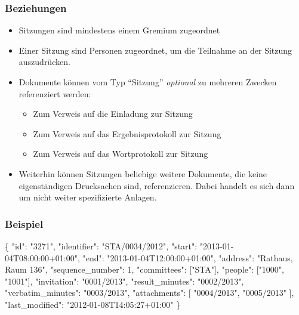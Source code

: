 \documentclass[,a4paper]{article}
\newenvironment{Shaded}{}{}
\newcommand{\DataTypeTok}[1]{\textcolor[rgb]{0.56,0.13,0.00}{{#1}}}
\newcommand{\DecValTok}[1]{\textcolor[rgb]{0.25,0.63,0.44}{{#1}}}
\newcommand{\StringTok}[1]{\textcolor[rgb]{0.25,0.44,0.63}{{#1}}}
\newcommand{\NormalTok}[1]{{#1}}
\begin{document}
\subsubsection{Beziehungen}

\begin{itemize}
\item
  Sitzungen sind mindestens einem Gremium zugeordnet
\item
  Einer Sitzung sind Personen zugeordnet, um die Teilnahme an der
  Sitzung auszudrücken.
\item
  Dokumente können vom Typ ``Sitzung'' \emph{optional} zu mehreren
  Zwecken referenziert werden:

  \begin{itemize}
  \item
    Zum Verweis auf die Einladung zur Sitzung
  \item
    Zum Verweis auf das Ergebnisprotokoll zur Sitzung
  \item
    Zum Verweis auf das Wortprotokoll zur Sitzung
  \end{itemize}
\item
  Weiterhin können Sitzungen beliebige weitere Dokumente, die keine
  eigenständigen Drucksachen sind, referenzieren. Dabei handelt es sich
  dann um nicht weiter spezifizierte Anlagen.
\end{itemize}

\subsubsection{Beispiel}

\begin{Shaded}
\begin{Highlighting}[]
\NormalTok{\{}
    \DataTypeTok{"id"}\NormalTok{: }\StringTok{"3271"}\NormalTok{,}
    \DataTypeTok{"identifier"}\NormalTok{: }\StringTok{"STA/0034/2012"}\NormalTok{,}
    \DataTypeTok{"start"}\NormalTok{: }\StringTok{"2013-01-04T08:00:00+01:00"}\NormalTok{,}
    \DataTypeTok{"end"}\NormalTok{: }\StringTok{"2013-01-04T12:00:00+01:00"}\NormalTok{,}
    \DataTypeTok{"address"}\NormalTok{: }\StringTok{"Rathaus, Raum 136"}\NormalTok{,}
    \DataTypeTok{"sequence_number"}\NormalTok{: }\DecValTok{1}\NormalTok{,}
    \DataTypeTok{"committees"}\NormalTok{: [}\StringTok{"STA"}\NormalTok{],}
    \DataTypeTok{"people"}\NormalTok{: [}\StringTok{"1000"}\NormalTok{, }\StringTok{"1001"}\NormalTok{],}
    \DataTypeTok{"invitation"}\NormalTok{: }\StringTok{"0001/2013"}\NormalTok{,}
    \DataTypeTok{"result_minutes"}\NormalTok{: }\StringTok{"0002/2013"}\NormalTok{,}
    \DataTypeTok{"verbatim_minutes"}\NormalTok{: }\StringTok{"0003/2013"}\NormalTok{,}
    \DataTypeTok{"attachments"}\NormalTok{: [}
        \StringTok{"0004/2013"}\NormalTok{,}
        \StringTok{"0005/2013"}
    \NormalTok{],}
    \DataTypeTok{"last_modified"}\NormalTok{: }\StringTok{"2012-01-08T14:05:27+01:00"}
\NormalTok{\}}
\end{Highlighting}
\end{Shaded}
\end{document}
